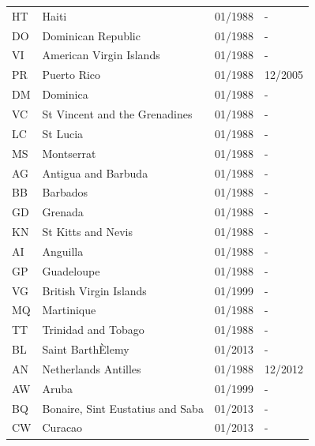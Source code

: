 \begin{small}
\begin{longtable}{p{0.5cm}p{9cm}p{2cm}p{2cm}}
HT	&	Haiti	&	01/1988	&	-	\\

DO	&	Dominican Republic	&	01/1988	&	-	\\

VI	&	American Virgin Islands	&	01/1988	&	-	\\

PR	&	Puerto Rico	&	01/1988	&	12/2005	\\

DM	&	Dominica	&	01/1988	&	-	\\

VC	&	St Vincent and the Grenadines	&	01/1988	&	-	\\

LC	&	St Lucia	&	01/1988	&	-	\\

MS	&	Montserrat	&	01/1988	&	-	\\

AG	&	Antigua and Barbuda	&	01/1988	&	-	\\

BB	&	Barbados	&	01/1988	&	-	\\

GD	&	Grenada	&	01/1988	&	-	\\

KN	&	St Kitts and Nevis	&	01/1988	&	-	\\

AI	&	Anguilla	&	01/1988	&	-	\\

GP	&	Guadeloupe	&	01/1988	&	-	\\

VG	&	British Virgin Islands	&	01/1999	&	-	\\

MQ	&	Martinique	&	01/1988	&	-	\\

TT	&	Trinidad and Tobago	&	01/1988	&	-	\\

BL	&	Saint BarthÈlemy	&	01/2013	&	-	\\

AN	&	Netherlands Antilles	&	01/1988	&	12/2012	\\

AW	&	Aruba	&	01/1999	&	-	\\

BQ	&	Bonaire, Sint Eustatius and Saba	&	01/2013	&	-	\\

CW	&	Curacao	&	01/2013	&	-	\\


\end{longtable}
\end{small}
